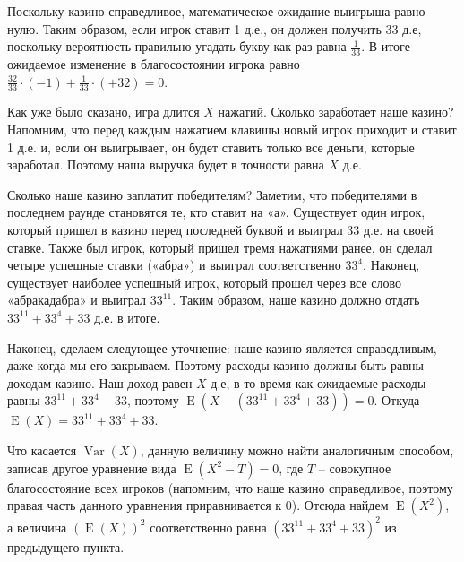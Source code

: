 \documentclass[nobib]{tufte-handout}
\theoremstyle{definition}
\newcounter{problem}
\newenvironment{problem}%
{%
\refstepcounter{problem}%
     \hypertarget{problem:{\theproblem}}{}
     \Writetofile{solution_file}{\protect\hypertarget{soln:\theproblem}{}}
     \begin{myenum}[label=\bfseries\protect\hyperlink{soln:\theproblem}{\theproblem},ref=\theproblem]
     \item%
    }%
    {%
    \end{myenum}}
\DeclareMathOperator{\Var}{Var}
\DeclareMathOperator{\E}{E}
\begin{document}
\begin{problem}
\begin{sol}
\begin{enumerate}
Поскольку казино справедливое, математическое ожидание выигрыша равно нулю.
Таким образом, если игрок ставит 1 д.е., он должен получить 33 д.е,
поскольку вероятность правильно угадать букву как раз равна $\frac{1}{33}$.
В итоге — ожидаемое изменение в благосостоянии игрока
равно $\frac{32}{33}\cdot(-1) + \frac{1}{33}\cdot(+32) = 0$.

Как уже было сказано, игра длится $X$ нажатий. Сколько заработает наше казино?
Напомним, что перед каждым нажатием клавишы новый игрок приходит и ставит 1 д.е.
и, если он выигрывает, он будет ставить только все деньги, которые заработал.
Поэтому наша выручка будет в точности равна $X$ д.е.

Сколько наше казино заплатит победителям? Заметим,
что победителями в последнем раунде становятся те, кто ставит на «а».
Существует один игрок, который пришел в казино перед последней буквой
и выиграл $33$ д.е. на своей ставке. Также был игрок,
который пришел тремя нажатиями ранее, он сделал четыре успешные ставки («абра»)
и выиграл соответственно $33^4$. Наконец, существует наиболее успешный игрок,
который прошел через все слово «абракадабра» и выиграл $33^{11}$.
Таким образом, наше казино должно отдать $33^{11}+33^4+33$ д.е. в итоге.

Наконец, сделаем следующее уточнение: наше казино является справедливым,
даже когда мы его закрываем. Поэтому расходы казино должны быть равны доходам казино.
Наш доход равен $X$ д.е, в то время как ожидаемые расходы равны $33^{11}+33^4+33$,
поэтому $\E (X - (33^{11}+33^4+33)) = 0$. Откуда $\E(X) = 33^{11}+33^4+33$.

Что касается $\Var(X)$, данную величину можно найти аналогичным способом,
записав другое уравнение вида $\E(X^2 - T)=0$, где $T$ – совокупное
благосостояние всех игроков (напомним, что наше казино справедливое,
поэтому правая часть данного уравнения приравнивается к $0$).
Отсюда найдем $\E(X^2)$, а величина $(\E(X))^2$
соответственно равна $(33^{11}+33^4+33)^2$ из предыдущего пункта.
\end{enumerate}
\end{sol}

\end{problem}
\end{document}
